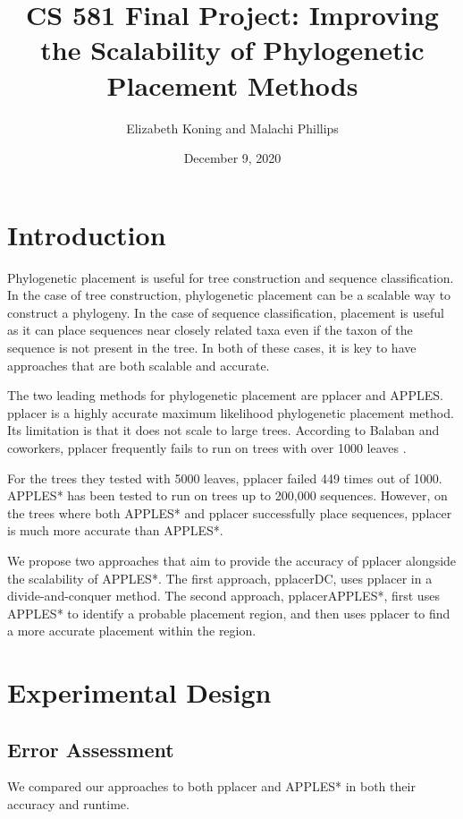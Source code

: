 \documentclass[10pt]{article}
\title{CS 581 Final Project: Improving the Scalability of Phylogenetic Placement Methods}
\author{Elizabeth Koning and Malachi Phillips}
\date{December 9, 2020}
\begin{document}
\vspace{-1cm}
\maketitle

\section{Introduction}

Phylogenetic placement is useful for tree construction and sequence classification. In the case of tree construction, phylogenetic placement can be a scalable way to construct a phylogeny. In the case of sequence classification, placement is useful as it can place sequences near closely related taxa even if the taxon of the sequence is not present in the tree. In both of these cases, it is key to have approaches that are both scalable and accurate.

The two leading methods for phylogenetic placement are pplacer and APPLES. pplacer \cite{matsen_pplacer_2010} is a highly accurate maximum likelihood phylogenetic placement method. Its limitation is that it does not scale to large trees. According to Balaban and coworkers,  pplacer frequently fails to run on trees with over 1000 leaves \cite{balaban_apples_2020}.

For the trees they tested with 5000 leaves, pplacer failed 449 times out of 1000. APPLES* has been tested to run on trees up to 200,000 sequences. However, on the trees where both APPLES* and pplacer successfully place sequences, pplacer is much more accurate than APPLES*.

We propose two approaches that aim to provide the accuracy of pplacer alongside the scalability of APPLES*. The first approach, pplacerDC, uses pplacer in a divide-and-conquer method. The second approach, pplacerAPPLES*, first uses APPLES* to identify a probable placement region, and then uses pplacer to find a more accurate placement within the region.

\section{Experimental Design}

\subsection{Error Assessment}

We compared our approaches to both pplacer and APPLES* in both their accuracy and runtime.
\end{document}
